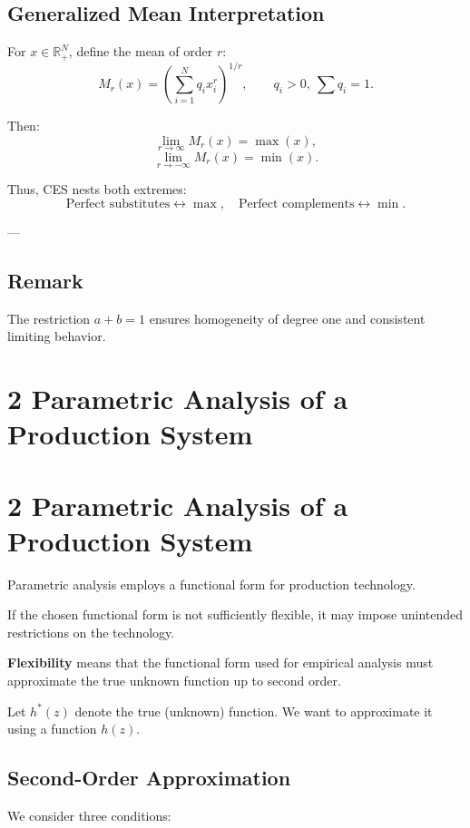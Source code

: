 \subsection*{Generalized Mean Interpretation}

For $x \in \mathbb{R}_+^N$, define the mean of order $r$:
\[
M_r(x)
=
\left( \sum_{i=1}^N q_i x_i^r \right)^{1/r},
\qquad q_i > 0,\ \sum q_i = 1.
\]

Then:
\[
\lim_{r \to \infty} M_r(x) = \max(x),
\]
\[
\lim_{r \to -\infty} M_r(x) = \min(x).
\]

Thus, CES nests both extremes:
\[
\text{Perfect substitutes} \leftrightarrow \max,
\quad
\text{Perfect complements} \leftrightarrow \min.
\]

---

\subsection*{Remark}

The restriction $a + b = 1$ ensures homogeneity of degree one and
consistent limiting behavior.

\section{2 Parametric Analysis of a Production System}


\section{2 Parametric Analysis of a Production System}

Parametric analysis employs a functional form for production technology.

If the chosen functional form is not sufficiently flexible, it may impose
unintended restrictions on the technology.

\medskip

\textbf{Flexibility} means that the functional form used for empirical
analysis must approximate the true unknown function up to second order.

Let $h^*(z)$ denote the true (unknown) function.
We want to approximate it using a function $h(z)$.

\subsection*{Second-Order Approximation}

We consider three conditions:

